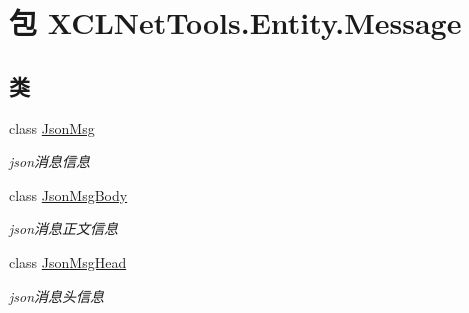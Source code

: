 \hypertarget{namespace_x_c_l_net_tools_1_1_entity_1_1_message}{\section{包 X\-C\-L\-Net\-Tools.\-Entity.\-Message}
\label{namespace_x_c_l_net_tools_1_1_entity_1_1_message}
}
\subsection*{类}
\begin{DoxyCompactItemize}
\item 
class \hyperlink{class_x_c_l_net_tools_1_1_entity_1_1_message_1_1_json_msg}{Json\-Msg}
\begin{DoxyCompactList}\small\item\em json消息信息 \end{DoxyCompactList}\item 
class \hyperlink{class_x_c_l_net_tools_1_1_entity_1_1_message_1_1_json_msg_body}{Json\-Msg\-Body}
\begin{DoxyCompactList}\small\item\em json消息正文信息 \end{DoxyCompactList}\item 
class \hyperlink{class_x_c_l_net_tools_1_1_entity_1_1_message_1_1_json_msg_head}{Json\-Msg\-Head}
\begin{DoxyCompactList}\small\item\em json消息头信息 \end{DoxyCompactList}\end{DoxyCompactItemize}
